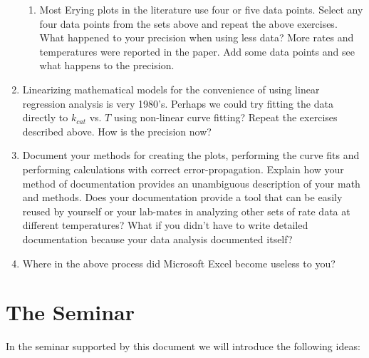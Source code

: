 \documentclass{tufte-handout}
\begin{document}
\begin{enumerate}
\begin{enumerate}
\item Most Erying plots in the literature use four or five data points. Select any four data points from the sets above and repeat the above exercises. What happened to your precision when using less data? More rates and temperatures were reported in the paper. Add some data points and see what happens to the precision.

\end{enumerate}

\item Linearizing mathematical models for the convenience of using linear re\-gres\-sion analysis is very 1980's. Perhaps we could try fitting the data directly to $k_{cat}$ vs. $T$ using non-linear curve fitting? Repeat the exercises described above. How is the precision now?

\item Document your methods for creating the plots, performing the curve fits and performing calculations with correct error-propagation. Explain how your method of documentation provides an unambiguous description of your math and methods. Does your documentation provide a tool that can be easily reused by yourself or your lab-mates in analyzing other sets of rate data at different temperatures? What if you didn't have to write detailed documentation because your data analysis documented itself?

\item Where in the above process did Microsoft Excel become useless to you?

\end{enumerate}

\clearpage
\section{The Seminar}

In the seminar supported by this document we will introduce the following ideas:
\end{document}
